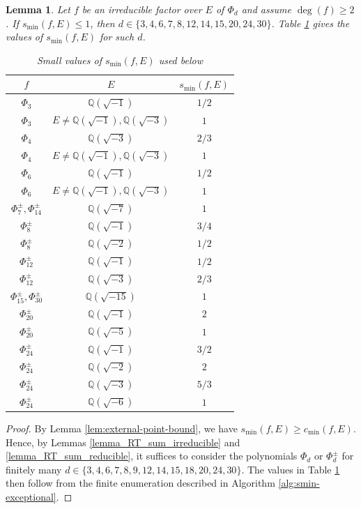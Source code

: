 \documentclass[11pt]{amsart}
\theoremstyle{plain}
\newtheorem{lem}[thm]{Lemma}
\theoremstyle{definition}
\numberwithin{equation}{section}
\newcommand{\bbQ}{\mathbb{Q}}
\begin{document}
\begin{lem}\label{lem_RT_sum_A_B_empty}
  Let $f$ be an irreducible factor over $E$ of $\Phi_d$ and assume $\deg(f) \geq 2$.
  If $s_{\min}(f,E) \leq 1$, then $d \in \{3,4,6,7,8,12,14,15,20,24,30\}$.
  Table \ref{table_list_S(X,0)<=1} gives the values of $s_{\min}(f,E)$ for such $d$.
\begin{table}[htbp]
  \centering
  \caption{Small values of $s_{\min}(f,E)$ used below}
  \label{table_list_S(X,0)<=1}
  \renewcommand{\arraystretch}{1.35}
  \setlength{\tabcolsep}{14pt}
  \begin{tabular}{ccc}
    \toprule
    $f$ & $E$ & $s_{\min}(f,E)$ \\
    \midrule
      $\Phi_3$ & $\bbQ(\sqrt{-1})$ & $1/2$ \\
      $\Phi_3$ & $E \neq \bbQ(\sqrt{-1}), \bbQ(\sqrt{-3})$ & $1$ \\
      \hline
      $\Phi_4$ & $\bbQ(\sqrt{-3})$ & $2/3$ \\
      $\Phi_4$ & $E \neq \bbQ(\sqrt{-1}), \bbQ(\sqrt{-3})$ & $1$ \\
      \hline
      $\Phi_6$ & $\bbQ(\sqrt{-1})$ & $1/2$ \\
      $\Phi_6$ & $E \neq \bbQ(\sqrt{-1}), \bbQ(\sqrt{-3})$ & $1$\\
      \hline
      $\Phi_{7}^\pm, \Phi_{14}^\pm$ & $\bbQ(\sqrt{-7})$ & $1$ \\
      \hline
      $\Phi_8^\pm$ & $\bbQ(\sqrt{-1})$ & $3/4$ \\
      $\Phi_8^\pm$ & $\bbQ(\sqrt{-2})$ & $1/2$ \\
      \hline
      $\Phi_{12}^\pm$ & $\bbQ(\sqrt{-1})$ & $1/2$ \\
      $\Phi_{12}^\pm$ & $\bbQ(\sqrt{-3})$ & $2/3$ \\
      \hline
      $\Phi_{15}^\pm, \Phi_{30}^\pm$ & $\bbQ(\sqrt{-15})$ & $1$ \\
      \hline
      $\Phi_{20}^\pm$ & $\bbQ(\sqrt{-1})$ & $2$ \\
      $\Phi_{20}^\pm$ & $\bbQ(\sqrt{-5})$ & $1$ \\
      \hline
      $\Phi_{24}^\pm$ & $\bbQ(\sqrt{-1})$ & $3/2$ \\
      $\Phi_{24}^\pm$ & $\bbQ(\sqrt{-2})$ & $2$ \\
      $\Phi_{24}^\pm$ & $\bbQ(\sqrt{-3})$ & $5/3$ \\
      $\Phi_{24}^\pm$ & $\bbQ(\sqrt{-6})$ & $1$\\\hline

  \end{tabular}
\end{table}
\end{lem}
\begin{proof}
    By Lemma \ref{lem:external-point-bound}, we have
  $s_{\min}(f,E) \geq c_{\min}(f,E)$.
    Hence, by Lemmas \ref{lemma_RT_sum_irreducible} and \ref{lemma_RT_sum_reducible}, it suffices to consider the polynomials $\Phi_d$ or $\Phi_d^\pm$ for finitely many $d \in \{3,4,6,7,8,9,12,14,15,18,20,24,30\}$.
    The values in Table \ref{table_list_S(X,0)<=1} then follow from the finite enumeration described in Algorithm \ref{alg:smin-exceptional}.
\end{proof}
\end{document}

